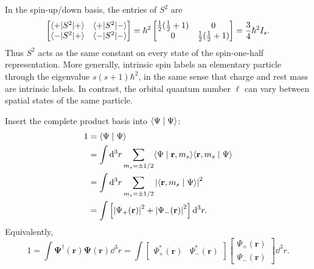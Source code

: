 In the spin-up/down basis, the entries of $S^2$ are
\[
 \begin{bmatrix}
  \langle +\rvert S^2\lvert +\rangle&\langle +\rvert S^2\lvert -\rangle\\
  \langle -\rvert S^2\lvert +\rangle&\langle -\rvert S^2\lvert -\rangle
 \end{bmatrix}
 =\hbar^2\begin{bmatrix}
  \tfrac12(\tfrac12+1)&0\\
  0&\tfrac12(\tfrac12+1)
 \end{bmatrix}
 =\frac34\hbar^2I_s.
\]
Thus $S^2$ acts as the same constant on every state of the
spin-one-half representation. More generally, intrinsic spin labels
an elementary particle through the eigenvalue $s(s+1)\hbar^2$, in the
same sense that charge and rest mass are intrinsic labels. In
contrast, the orbital quantum number $\ell$ can vary between spatial
states of the same particle.

Insert the complete product basis into $\langle \Psi\mid \Psi\rangle$:
\begin{align*}
 1&=\langle \Psi\mid \Psi\rangle\\
  &=\int\mathop{}\!\mathrm{d}^3r\sum_{m_s=\pm1/2}
     \langle \Psi\mid \mathbf r,m_s\rangle
     \langle \mathbf r,m_s\mid \Psi\rangle\\
  &=\int\mathop{}\!\mathrm{d}^3r\sum_{m_s=\pm1/2}
     \left\lvert\langle \mathbf r,m_s\mid \Psi\rangle\right\rvert^2\\
  &=\int\left[\left\lvert\Psi_+(\mathbf r)\right\rvert^2
                    +\left\lvert\Psi_-(\mathbf r)\right\rvert^2\right]\mathop{}\!\mathrm{d}^3r.
\end{align*}
Equivalently,
\[
 1=\int\boldsymbol\Psi^\dagger(\mathbf r)
          \boldsymbol\Psi(\mathbf r)\dd^3r
 =\int
 \begin{bmatrix}\Psi_+^*(\mathbf r)&\Psi_-^*(\mathbf r)\end{bmatrix}
 \begin{bmatrix}\Psi_+(\mathbf r)\\\Psi_-(\mathbf r)\end{bmatrix}
 \dd^3r.
\]
